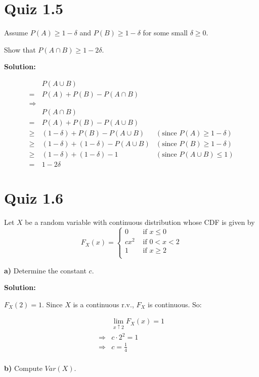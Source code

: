 \documentclass{article}
\begin{document}
\section{Quiz 1.5}

Assume
\(P(A) \geq 1-\delta\) and \(P(B) \geq 1-\delta\) for some small \(\delta\geq0\).

Show that \(P(A\cap B) \geq 1-2\delta\).

\textbf{Solution:}

\begin{align*}
	 & P(A\cup B) \\
	=& P(A)+P(B)-P(A\cap B) \\
	\Rightarrow& \\
	 & P(A\cap B) \\
	=& P(A)+P(B)-P(A\cup B) \\
	\geq& (1-\delta)+P(B)-P(A\cup B) & (\text{since }P(A) \geq 1-\delta) \\
	\geq& (1-\delta)+(1-\delta)-P(A\cup B) & (\text{since }P(B) \geq 1-\delta) \\
	\geq& (1-\delta)+(1-\delta)-1 & (\text{since }P(A\cup B) \leq 1) \\
	=& 1-2\delta
\end{align*}

\section{Quiz 1.6}

Let \(X\) be a random variable with continuous distribution whose CDF is given by
\[F_X(x) = \begin{cases}
	0 &\text{ if } x\leq 0 \\
	cx^2 &\text{ if } 0<x<2 \\
	1 &\text{ if } x \geq 2 \\
\end{cases}\]

\textbf{a)} Determine the constant \(c\).

\textbf{Solution:}

\(F_X(2)=1\). Since \(X\) is a continuous r.v., \(F_X\) is continuous. So:

\begin{align*}
	 & \lim_{x\uparrow 2}F_X(x)=1 \\
	\Rightarrow & c\cdot 2^2=1 \\
	\Rightarrow & c=\frac14 \\
\end{align*}

\textbf{b)} Compute \(Var(X)\).
\end{document}
